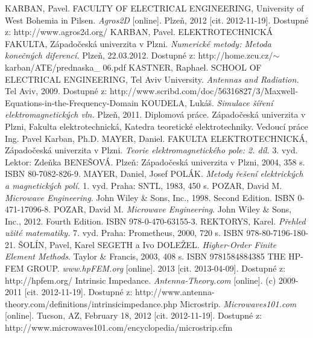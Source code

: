 \documentclass[12pt,a4paper,oneside]{article}
\numberwithin{equation}{section} %
\numberwithin{figure}{section} %
\numberwithin{table}{section} %
\begin{document}
\newpage
{} %
\begin{thebibliography}{10}

 KARBAN, Pavel. FACULTY OF ELECTRICAL ENGINEERING, University of West Bohemia in Pilsen. \textit{Agros2D} [online]. Plzeň, 2012 [cit. 2012-11-19]. Dostupné z: http://www.agros2d.org/
 KARBAN, Pavel. ELEKTROTECHNICKÁ FAKULTA, Západočeská univerzita v Plzni. \textit{Numerické metody: Metoda konečných diferencí.} Plzeň, 22.03.2012. Dostupné z: http://home.zcu.cz/$\sim$karban/ATE/prednaska\_ 06.pdf
 KASTNER, Raphael. SCHOOL OF ELECTRICAL ENGINEERING, Tel Aviv University. \textit{Antennas and Radiation.} Tel Aviv, 2009. Dostupné z: http://www.scribd.com/doc/56316827/3/Maxwell-Equations-in-the-Frequency-Domain
 KOUDELA, Lukáš. \textit{Simulace šíření elektromagnetických vln.} Plzeň, 2011. Diplomová práce. Západočeská univerzita v Plzni, Fakulta elektrotechnická, Katedra teoretické elektrotechniky. Vedoucí práce Ing. Pavel Karban, Ph.D.
 MAYER, Daniel. FAKULTA ELEKTROTECHNICKÁ, Západočeská univerzita v Plzni. \textit{Teorie elektromagnetického pole: 2. díl.} 3. vyd. Lektor: Zdeňka BENEŠOVÁ. Plzeň: Západočeská univerzita v Plzni, 2004, 358 s. ISBN 80-7082-826-9.
 MAYER, Daniel, Josef POLÁK. \textit{Metody řešení elektrických a magnetických polí.} 1. vyd. Praha: SNTL, 1983, 450 s.
 POZAR, David M. \textit{Microwave Engineering}. John Wiley \& Sons, Inc., 1998. Second Edition. ISBN 0-471-17096-8.
 POZAR, David M. \textit{Microwave Engineering}. John Wiley \& Sons, Inc., 2012. Fourth Edition. ISBN 978-0-470-63155-3.
 REKTORYS, Karel. \textit{Přehled užité matematiky.} 7. vyd. Praha: Prometheus, 2000, 720 s. ISBN 978-80-7196-180-21.
 ŠOLÍN, Pavel, Karel SEGETH a Ivo DOLEŽEL. \textit{Higher-Order Finite Element Methods}. Taylor \& Francis, 2003, 408 s. ISBN 9781584884385
 THE HP-FEM GROUP. \textit{www.hpFEM.org} [online]. 2013 [cit. 2013-04-09]. Dostupné z: http://hpfem.org/
 Intrinsic Impedance. \textit{Antenna-Theory.com} [online]. (c) 2009-2011 [cit. 2012-11-19]. Dostupné z: http://www.antenna-theory.com/definitions/intrinsicimpedance.php
 Microstrip. \textit{Microwaves101.com} [online]. Tucson, AZ, February 18, 2012 [cit. 2012-11-19]. Dostupné z: http://www.microwaves101.com/encyclopedia/microstrip.cfm

\end{thebibliography}
\end{document}

